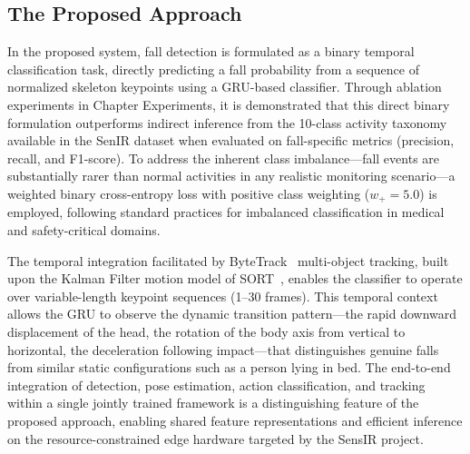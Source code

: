 \subsection*{The Proposed Approach}

In the proposed system, fall detection is formulated as a binary temporal classification task, directly predicting a fall probability from a sequence of normalized skeleton keypoints using a GRU-based classifier. Through ablation experiments in Chapter Experiments, it is demonstrated that this direct binary formulation outperforms indirect inference from the 10-class activity taxonomy available in the SenIR dataset when evaluated on fall-specific metrics (precision, recall, and F1-score). To address the inherent class imbalance---fall events are substantially rarer than normal activities in any realistic monitoring scenario---a weighted binary cross-entropy loss with positive class weighting ($w_+ = 5.0$) is employed, following standard practices for imbalanced classification in medical and safety-critical domains.

The temporal integration facilitated by ByteTrack~\cite{zhang2022bytetrack} multi-object tracking, built upon the Kalman Filter motion model of SORT~\cite{bewley2016simple}, enables the classifier to operate over variable-length keypoint sequences (1--30 frames). This temporal context allows the GRU to observe the dynamic transition pattern---the rapid downward displacement of the head, the rotation of the body axis from vertical to horizontal, the deceleration following impact---that distinguishes genuine falls from similar static configurations such as a person lying in bed. The end-to-end integration of detection, pose estimation, action classification, and tracking within a single jointly trained framework is a distinguishing feature of the proposed approach, enabling shared feature representations and efficient inference on the resource-constrained edge hardware targeted by the SensIR project.